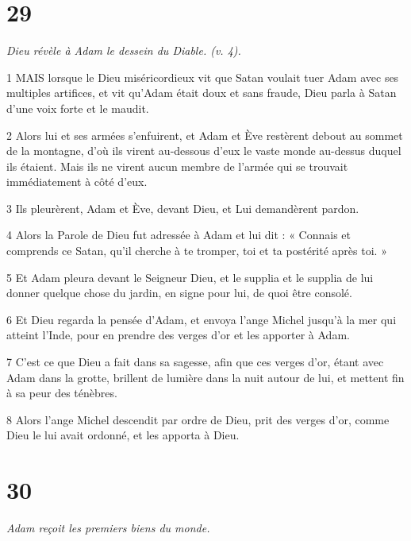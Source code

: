 \chapter{29}

\par \textit{Dieu révèle à Adam le dessein du Diable. (v. 4).}

\par 1 MAIS lorsque le Dieu miséricordieux vit que Satan voulait tuer Adam avec ses multiples artifices, et vit qu'Adam était doux et sans fraude, Dieu parla à Satan d'une voix forte et le maudit.

\par 2 Alors lui et ses armées s'enfuirent, et Adam et Ève restèrent debout au sommet de la montagne, d'où ils virent au-dessous d'eux le vaste monde au-dessus duquel ils étaient. Mais ils ne virent aucun membre de l'armée qui se trouvait immédiatement à côté d'eux.

\par 3 Ils pleurèrent, Adam et Ève, devant Dieu, et Lui demandèrent pardon.

\par 4 Alors la Parole de Dieu fut adressée à Adam et lui dit : « Connais et comprends ce Satan, qu'il cherche à te tromper, toi et ta postérité après toi. »

\par 5 Et Adam pleura devant le Seigneur Dieu, et le supplia et le supplia de lui donner quelque chose du jardin, en signe pour lui, de quoi être consolé.

\par 6 Et Dieu regarda la pensée d'Adam, et envoya l'ange Michel jusqu'à la mer qui atteint l'Inde, pour en prendre des verges d'or et les apporter à Adam.

\par 7 C'est ce que Dieu a fait dans sa sagesse, afin que ces verges d'or, étant avec Adam dans la grotte, brillent de lumière dans la nuit autour de lui, et mettent fin à sa peur des ténèbres.

\par 8 Alors l'ange Michel descendit par ordre de Dieu, prit des verges d'or, comme Dieu le lui avait ordonné, et les apporta à Dieu.

\chapter{30}

\par \textit{Adam reçoit les premiers biens du monde.}

